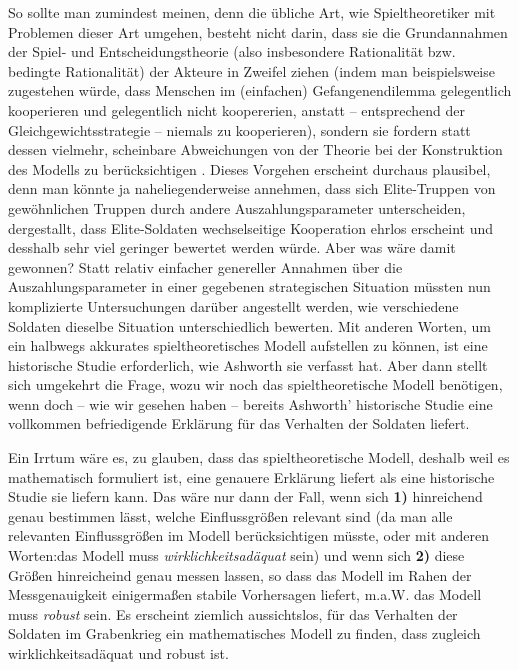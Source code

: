\documentclass[12pt,a4paper,ngerman]{article}
\begin{document}
So sollte man zumindest meinen, denn die übliche Art, wie
Spieltheoretiker mit Problemen dieser Art umgehen, besteht nicht
darin, dass sie die Grundannahmen der Spiel- und Entscheidungstheorie
(also insbesondere Rationalität bzw. bedingte Rationalität) der
Akteure in Zweifel ziehen (indem man beispielsweise zugestehen würde,
dass Menschen im (einfachen) Gefangenendilemma gelegentlich
kooperieren und gelegentlich nicht koopererien, anstatt --
entsprechend der Gleichgewichtsstrategie -- niemals zu kooperieren),
sondern sie fordern statt dessen vielmehr, scheinbare Abweichungen von
der Theorie bei der Konstruktion des Modells zu berücksichtigen \cite[S.
161/162]{binmore:1994}. Dieses Vorgehen erscheint durchaus plausibel, denn man
könnte ja naheliegenderweise annehmen, dass sich Elite-Truppen von gewöhnlichen
Truppen durch andere Auszahlungsparameter unterscheiden, dergestallt, dass
Elite-Soldaten wechselseitige Kooperation ehrlos erscheint und desshalb sehr
viel geringer bewertet werden würde. Aber was wäre damit gewonnen?  Statt
relativ einfacher genereller Annahmen über die Auszahlungsparameter in
einer gegebenen strategischen Situation müssten nun komplizierte
Untersuchungen darüber angestellt werden, wie verschiedene Soldaten
dieselbe Situation unterschiedlich bewerten. Mit anderen Worten, um
ein halbwegs akkurates spieltheoretisches Modell aufstellen zu können,
ist eine historische Studie erforderlich, wie Ashworth sie verfasst
hat. Aber dann stellt sich umgekehrt die Frage, wozu wir noch das
spieltheoretische Modell benötigen, wenn doch -- wie wir gesehen haben
-- bereits Ashworth' historische Studie eine vollkommen befriedigende
Erklärung für das Verhalten der Soldaten liefert.

Ein Irrtum wäre es, zu glauben, dass das spieltheoretische Modell,
deshalb weil es mathematisch formuliert ist, eine genauere Erklärung
liefert als eine historische Studie sie liefern kann. Das wäre nur
dann der Fall, wenn sich {\bf 1)} hinreichend genau bestimmen lässt, welche
Einflussgrößen relevant sind (da man alle relevanten Einflussgrößen im
Modell berücksichtigen müsste, oder mit anderen Worten:das
Modell muss  {\em wirklichkeitsadäquat} sein) und wenn sich {\bf 2)} diese
Größen hinreicheind genau messen lassen, so dass das Modell im Rahen der
Messgenauigkeit einigermaßen stabile Vorhersagen liefert, m.a.W. das 
Modell muss {\em robust} sein. Es erscheint ziemlich aussichtslos, für
das Verhalten der Soldaten im Grabenkrieg ein mathematisches Modell zu
finden, dass zugleich wirklichkeitsadäquat und robust ist.
\end{document}
